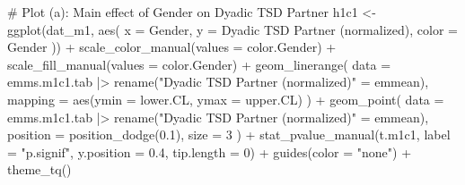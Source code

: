 \documentclass[
  bookmarksnumbered]{article}
\newenvironment{Shaded}{\begin{snugshade}}{\end{snugshade}}
\newcommand{\AttributeTok}[1]{\textcolor[rgb]{0.80,0.80,0.80}{#1}}
\newcommand{\CommentTok}[1]{\textcolor[rgb]{0.50,0.62,0.50}{#1}}
\newcommand{\DecValTok}[1]{\textcolor[rgb]{0.86,0.86,0.80}{#1}}
\newcommand{\FloatTok}[1]{\textcolor[rgb]{0.75,0.75,0.82}{#1}}
\newcommand{\FunctionTok}[1]{\textcolor[rgb]{0.94,0.94,0.56}{#1}}
\newcommand{\NormalTok}[1]{\textcolor[rgb]{0.80,0.80,0.80}{#1}}
\newcommand{\OtherTok}[1]{\textcolor[rgb]{0.94,0.94,0.56}{#1}}
\newcommand{\SpecialCharTok}[1]{\textcolor[rgb]{0.86,0.64,0.64}{#1}}
\newcommand{\StringTok}[1]{\textcolor[rgb]{0.80,0.58,0.58}{#1}}
\begin{document}
\begin{Shaded}
\begin{Highlighting}[]
\CommentTok{\# Plot (a): Main effect of Gender on Dyadic TSD Partner}
\NormalTok{h1c1 }\OtherTok{\textless{}{-}} \FunctionTok{ggplot}\NormalTok{(dat\_m1, }\FunctionTok{aes}\NormalTok{(}
  \AttributeTok{x =}\NormalTok{ Gender, }\AttributeTok{y =} \StringTok{\textasciigrave{}}\AttributeTok{Dyadic TSD Partner (normalized)}\StringTok{\textasciigrave{}}\NormalTok{, }\AttributeTok{color =}\NormalTok{ Gender}
\NormalTok{)) }\SpecialCharTok{+}
  \FunctionTok{scale\_color\_manual}\NormalTok{(}\AttributeTok{values =}\NormalTok{ color.Gender) }\SpecialCharTok{+}
  \FunctionTok{scale\_fill\_manual}\NormalTok{(}\AttributeTok{values =}\NormalTok{ color.Gender) }\SpecialCharTok{+}
  \FunctionTok{geom\_linerange}\NormalTok{(}
    \AttributeTok{data =}\NormalTok{ emms.m1c1.tab }\SpecialCharTok{|\textgreater{}} \FunctionTok{rename}\NormalTok{(}\StringTok{"Dyadic TSD Partner (normalized)"} \OtherTok{=}\NormalTok{ emmean),}
    \AttributeTok{mapping =} \FunctionTok{aes}\NormalTok{(}\AttributeTok{ymin =}\NormalTok{ lower.CL, }\AttributeTok{ymax =}\NormalTok{ upper.CL)}
\NormalTok{  ) }\SpecialCharTok{+}
  \FunctionTok{geom\_point}\NormalTok{(}
    \AttributeTok{data =}\NormalTok{ emms.m1c1.tab }\SpecialCharTok{|\textgreater{}} \FunctionTok{rename}\NormalTok{(}\StringTok{"Dyadic TSD Partner (normalized)"} \OtherTok{=}\NormalTok{ emmean),}
    \AttributeTok{position =} \FunctionTok{position\_dodge}\NormalTok{(}\FloatTok{0.1}\NormalTok{), }\AttributeTok{size =} \DecValTok{3}
\NormalTok{  ) }\SpecialCharTok{+}
  \FunctionTok{stat\_pvalue\_manual}\NormalTok{(t.m1c1, }\AttributeTok{label =} \StringTok{"p.signif"}\NormalTok{, }\AttributeTok{y.position =} \FloatTok{0.4}\NormalTok{, }\AttributeTok{tip.length =} \DecValTok{0}\NormalTok{) }\SpecialCharTok{+}
  \FunctionTok{guides}\NormalTok{(}\AttributeTok{color =} \StringTok{"none"}\NormalTok{) }\SpecialCharTok{+}
  \FunctionTok{theme\_tq}\NormalTok{()}


\end{Highlighting}
\end{Shaded}
\end{document}
